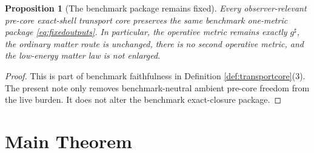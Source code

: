 \documentclass[11pt]{article}
\newcommand{\CompletedMetric}{g^{\sharp}}
\newtheorem{proposition}{Proposition}
\begin{document}
\begin{proposition}[The benchmark package remains fixed]
\label{prop:benchmark}
Every observer-relevant pre-core exact-shell transport core preserves the same benchmark one-metric package \eqref{eq:fixedoutputs}. In particular, the operative metric remains exactly \(\CompletedMetric\), the ordinary matter route is unchanged, there is no second operative metric, and the low-energy matter law is not enlarged.
\end{proposition}

\begin{proof}
This is part of benchmark faithfulness in Definition \ref{def:transportcore}(3). The present note only removes benchmark-neutral ambient pre-core freedom from the live burden. It does not alter the benchmark exact-closure package.
\end{proof}

\section{Main Theorem}
\end{document}
